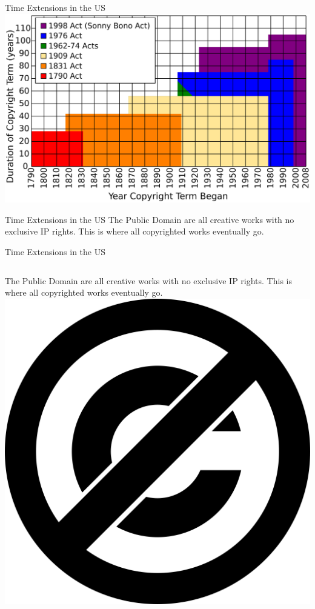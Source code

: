 \begin{frame}{Time Extensions in the US}
  \includegraphics[width=\textwidth]{eimg/TomBell'sgraphshowingextensionofUScopyrighttermovertime.png}
\end{frame}

\begin{frame}{Time Extensions in the US}
  The Public Domain are all creative works with no exclusive IP rights. This is where all copyrighted works eventually go.
\end{frame}

\begin{frame}{Time Extensions in the US}
\begin{columns}[onlytextwidth,T]
    The Public Domain are all creative works with no exclusive IP rights. This is where all copyrighted works eventually go.
  \center \includegraphics[width=\textwidth]{eimg/PDSymbol.png}
  \end{columns}
\end{frame}

